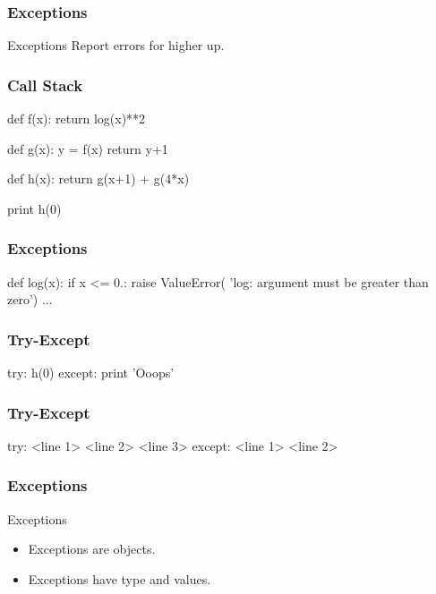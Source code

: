 \begin{frame}[fragile]
\frametitle{Exceptions}

\begin{block}{Exceptions}
Report errors for higher up.
\end{block}

\end{frame}

\begin{frame}[fragile]
\frametitle{Call Stack}
\begin{python}
def f(x):
    return log(x)**2

def g(x):
    y = f(x)
    return y+1

def h(x):
    return g(x+1) + g(4*x)

print h(0)
\end{python}
\end{frame}

\begin{frame}[fragile]
\frametitle{Exceptions}

\begin{python}
def log(x):
    if x <= 0.:
        raise ValueError(
            'log: argument must be greater than zero')
    ...
\end{python}
\end{frame}

\begin{frame}[fragile]
\frametitle{Try-Except}

\begin{python}
try:
    h(0)
except:
    print 'Ooops'
\end{python}
\end{frame}

\begin{frame}[fragile]
\frametitle{Try-Except}

\begin{python}
try:
    <line 1>
    <line 2>
    <line 3>
except:
    <line 1>
    <line 2>
\end{python}
\end{frame}

\begin{frame}[fragile]
\frametitle{Exceptions}

\begin{block}{Exceptions}
\begin{itemize}
\item Exceptions are \alert{objects}.
\item Exceptions have \alert{type} and \alert{values}.
\end{itemize}
\end{block}
\end{frame}

